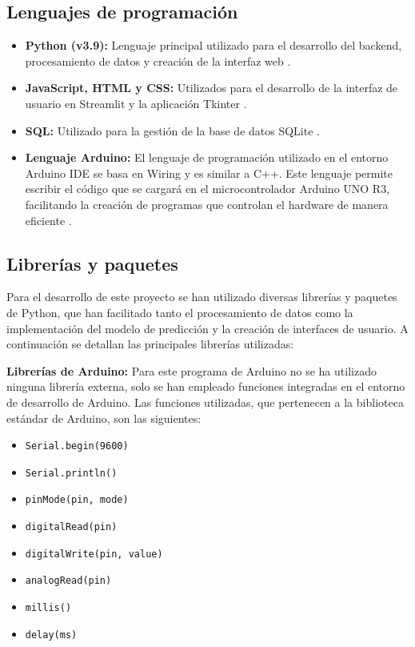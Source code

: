 \subsection{Lenguajes de programación}

\begin{itemize}

\item \textbf{Python (v3.9):} Lenguaje principal utilizado para el desarrollo del backend, procesamiento de datos y creación de la interfaz web \cite{Python}.

\item \textbf{JavaScript, HTML y CSS:} Utilizados para el desarrollo de la interfaz de usuario en Streamlit y la aplicación Tkinter \cite{WebTechnologies}.

\item \textbf{SQL:} Utilizado para la gestión de la base de datos SQLite \cite{SQL}.

\item \textbf{Lenguaje Arduino:} El lenguaje de programación utilizado en el entorno Arduino IDE se basa en Wiring y es similar a C++. Este lenguaje permite escribir el código que se cargará en el microcontrolador Arduino UNO R3, facilitando la creación de programas que controlan el hardware de manera eficiente \cite{ArduinoLanguage}.

\end{itemize}

\subsection{Librerías y paquetes}
Para el desarrollo de este proyecto se han utilizado diversas librerías y paquetes de Python, que han facilitado tanto el procesamiento de datos como la implementación del modelo de predicción y la creación de interfaces de usuario. A continuación se detallan las principales librerías utilizadas:


\textbf{Librerías de Arduino:}
Para este programa de Arduino no se ha utilizado ninguna librería externa, solo se han empleado funciones integradas en el entorno de desarrollo de Arduino. Las funciones utilizadas, que pertenecen a la biblioteca estándar de Arduino, son las siguientes:

\begin{itemize}
    \item \texttt{Serial.begin(9600)}
    \item \texttt{Serial.println()}
    \item \texttt{pinMode(pin, mode)}
    \item \texttt{digitalRead(pin)}
    \item \texttt{digitalWrite(pin, value)}
    \item \texttt{analogRead(pin)}
    \item \texttt{millis()}
    \item \texttt{delay(ms)}
\end{itemize}

